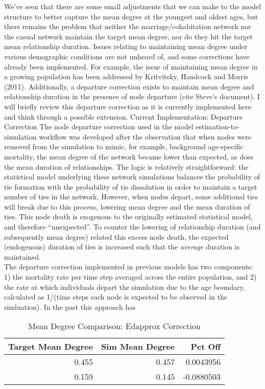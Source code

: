 \documentclass [11pt, proquest] {uwthesis}[2015/03/03]
\begin{document}
We've seen that there are some small adjustments that we can make to the
model structure to better capture the mean degree at the youngest and
oldest ages, but there remains the problem that neither the
marriage/cohabitation network nor the casual network maintain the target
mean degree, nor do they hit the target mean relationship duration.
Issues relating to maintaining mean degree under various demographic
conditions are not unheard of, and some corrections have already been
implemented. For example, the issue of maintaining mean degree in a
growing population has been addressed by Kritvitsky, Handcock and Morris
(2011). Additionally, a departure correction exists to maintain mean
degree and relationship duration in the presence of node departure (cite
Steve's document). I will briefly review this departure correction as it
is currently implemented here and think through a possible extension.
Current Implementation: Departure Correction The node departure
correction used in the model estimation-to-simulation workflow was
developed after the observation that when nodes were removed from the
simulation to mimic, for example, background age-specific mortality, the
mean degree of the network became lower than expected, as does the mean
duration of relationships. The logic is relatively straightforward: the
statistical model underlying these network simulations balances the
probability of tie formation with the probability of tie dissolution in
order to maintain a target number of ties in the network. However, when
nodes depart, some additional ties will break due to this process,
lowering mean degree and the mean duration of ties. This node death is
exogenous to the originally estimated statistical model, and therefore
``unexpected''. To counter the lowering of relationship duration (and
subsequently mean degree) related this excess node death, the expected
(endogenous) duration of ties is increased such that the \emph{average}
duration is maintained.\\
The departure correction implemented in previous models has two
components: 1) the mortality rate per time step averaged across the
entire population, and 2) the rate at which individuals depart the
simulation due to the age boundary, calculated as 1/(time steps each
node is expected to be observed in the simluation). In the past this
approach has
\begin{table}

\caption{\label{tab:scen6-tab}Mean Degree Comparison: Edapprox Correction}
\centering
\begin{tabular}[t]{rrr}
\toprule
Target Mean Degree & Sim Mean Degree & Pct Off\\
\midrule
0.455 & 0.457 & 0.0043956\\
0.159 & 0.145 & -0.0880503\\
\bottomrule
\end{tabular}
\end{table}
\end{document}

